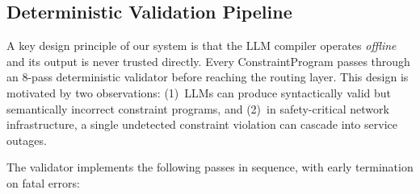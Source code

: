 
\subsection{Deterministic Validation Pipeline}
\label{sec:validator}

A key design principle of our system is that the LLM compiler operates
\textit{offline} and its output is never trusted directly. Every
ConstraintProgram passes through an 8-pass deterministic validator before
reaching the routing layer. This design is motivated by two observations:
(1)~LLMs can produce syntactically valid but semantically incorrect
constraint programs, and (2)~in safety-critical network infrastructure,
a single undetected constraint violation can cascade into service outages.

The validator implements the following passes in sequence, with early
termination on fatal errors:

